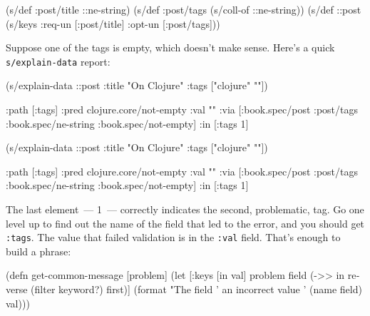 \else

\begin{english}
  \begin{clojure}
(s/def :post/title ::ne-string)
(s/def :post/tags (s/coll-of ::ne-string))
(s/def ::post (s/keys :req-un [:post/title]
                      :opt-un [:post/tags]))
  \end{clojure}
\end{english}

\fi

Suppose one of the tags is empty, which doesn't make sense. Here's a quick \verb|s/explain-data| report:

\ifx\DEVICETYPE\MOBILE

\begin{english}
  \begin{clojure}
(s/explain-data ::post
  {:title "On Clojure"
   :tags ["clojure" ""]})

{:path [:tags]
 :pred clojure.core/not-empty
 :val ""
 :via [:book.spec/post
       :post/tags
       :book.spec/ne-string
       :book.spec/not-empty]
 :in [:tags 1]}
  \end{clojure}
\end{english}

\else

\begin{english}
  \begin{clojure}
(s/explain-data ::post {:title "On Clojure"
                        :tags ["clojure" ""]})

{:path [:tags]
 :pred clojure.core/not-empty
 :val ""
 :via [:book.spec/post
       :post/tags
       :book.spec/ne-string
       :book.spec/not-empty]
 :in [:tags 1]}
  \end{clojure}
\end{english}

\fi

The last element~--- 1~--- correctly indicates the second, problematic, tag. Go one level up to find out the name of the field that led to the error, and you should get \verb|:tags|. The value that failed validation is in the \verb|:val| field. That's enough to build a phrase:

\ifx\DEVICETYPE\MOBILE

\begin{english}
  \begin{clojure}
(defn get-common-message
  [problem]
  (let [{:keys [in val]} problem
        field (->> in
                   reverse
                   (filter keyword?)
                   first)]
    (format
      "The field '%
                an incorrect value '%
      (name field) val)))
  \end{clojure}
\end{english}

